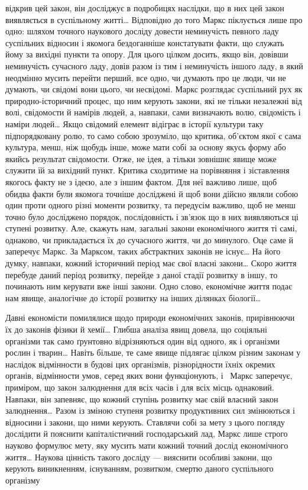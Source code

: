 \parcont{}  %
відкрив цей закон, він досліджує в подробицях наслідки, що в
них цей закон виявляється в суспільному житті\dots{} Відповідно до
того Маркс піклується лише про одно: шляхом точного наукового
досліду довести неминучість певного ладу суспільних відносин
і якомога бездоганніше констатувати факти, що служать йому
за вихідні пункти та опору. Для цього цілком досить, якщо він,
довівши неминучість сучасного ладу, довів разом із тим і неминучість
іншого ладу, в який неодмінно мусить перейти перший, все
одно, чи думають про це люди, чи не думають, чи свідомі вони
цього, чи несвідомі. Маркс розглядає суспільний рух як природно-історичний
процес, що ним керують закони, які не тільки незалежні
від волі, свідомости й намірів людей, а, навпаки, сами
визначають волю, свідомість і наміри людей\dots{} Якщо свідомий
елемент відіграє в історії культури таку підпорядковану ролю,
то само собою зрозуміло, що критика, об’єктом якої є сама культура,
менш, ніж щобудь інше, може мати собі за основу якусь форму
або якийсь результат свідомости. Отже, не ідея, а тільки зовнішнє
явище може служити їй за вихідний пункт. Критика сходитиме
на порівняння і зіставлення якогось факту не з ідеєю, але з іншим
фактом. Для неї важливо лише, щоб обидва факти були якомога
точніше досліджені й щоб вони дійсно являли собою один проти
одного різні моменти розвитку, та передусім важливо, щоб не
менш точно було досліджено порядок, послідовність і зв’язок
що в них виявляються ці ступені розвитку. Але, скажуть нам,
загальні закони економічного життя ті самі, однаково, чи
прикладається їх до сучасного життя, чи до минулого. Оце саме
й заперечує Маркс. За Марксом, таких абстрактних законів не
існує\dots{} На його думку, навпаки, кожний історичний період має
свої власні закони\dots{} Скоро життя перебуде даний період розвитку,
перейде з даної стадії розвитку в іншу, то починають ним керувати
вже інші закони. Одно слово, економічне життя подає нам
явище, аналогічне до історії розвитку на інших ділянках біології\dots{}

Давні економісти помилялися щодо природи економічних законів,
прирівнюючи їх до законів фізики й хемії\dots{} Глибша аналіза
явищ довела, що соціяльні організми так само ґрунтовно відрізняються
один від одного, як і організми рослин і тварин\dots{} Навіть
більше, те саме явище підлягає цілком різним законам у наслідок
відмінности в будові цих організмів, різнорідности їхніх окремих
органів, відмінности умов, серед яких вони функціонують, і~
Маркс заперечує, приміром, що закон залюднення для всіх часів
і для всіх місць однаковий. Навпаки, він запевняє, що кожний
ступінь розвитку має свій власний закон залюднення\dots{} Разом із
зміною ступеня розвитку продуктивних сил змінюються і відносини
і закони, що ними керують. Ставлячи собі за мету з цього
погляду дослідити й пояснити капіталістичний господарський лад,
Маркс лише строго науково формулює мету, яку мусить мати
кожний точний дослід економічного життя\dots{} Наукова цінність
такого досліду — вияснити особливі закони, що керують виникненням,
існуванням, розвитком, смертю даного суспільного організму
\parbreak{}  %

